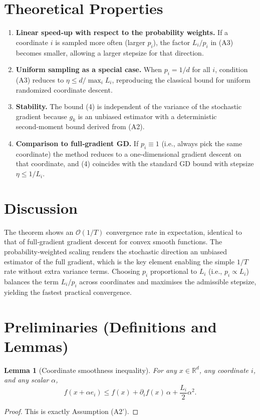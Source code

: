 \documentclass[11pt]{article}
\newtheorem{lemma}{Lemma}
\newcommand{\RR}{\mathbb{R}}
\begin{document}
\section*{Theoretical Properties}
\begin{enumerate}[label=\textbf{P\arabic*}, leftmargin=*]
\item \textbf{Linear speed‑up with respect to the probability weights.}
If a coordinate $i$ is sampled more often (larger $p_i$), the factor $L_i/p_i$ in (A3) becomes smaller, allowing a larger stepsize for that direction.

\item \textbf{Uniform sampling as a special case.}
When $p_i=1/d$ for all $i$, condition (A3) reduces to $\eta\le d/\max_i L_i$, reproducing the classical bound for uniform randomized coordinate descent.

\item \textbf{Stability.}
The bound (4) is independent of the variance of the stochastic gradient because $g_k$ is an unbiased estimator with a deterministic second‑moment bound derived from (A2).

\item \textbf{Comparison to full‑gradient GD.}
If $p_i\equiv1$ (i.e., always pick the same coordinate) the method reduces to a one‑dimensional gradient descent on that coordinate, and (4) coincides with the standard GD bound with stepsize $\eta\le 1/L_i$.
\end{enumerate}

\section*{Discussion}
The theorem shows an $\mathcal O(1/T)$ convergence rate in expectation, identical to that of full‑gradient gradient descent for convex smooth functions. The probability‑weighted scaling renders the stochastic direction an unbiased estimator of the full gradient, which is the key element enabling the simple $1/T$ rate without extra variance terms. Choosing $p_i$ proportional to $L_i$ (i.e., $p_i\propto L_i$) balances the term $L_i/p_i$ across coordinates and maximises the admissible stepsize, yielding the fastest practical convergence.

\newpage

\section*{Preliminaries (Definitions and Lemmas)}
\begin{lemma}[Coordinate smoothness inequality]\label{lem:smooth}
For any $x\in\RR^{d}$, any coordinate $i$, and any scalar $\alpha$,
\[
f(x+\alpha e_i)\le f(x)+\partial_i f(x)\,\alpha+\frac{L_i}{2}\alpha^{2}.
\]
\end{lemma}
\begin{proof}
This is exactly Assumption (A2'). \qedhere
\end{proof}
\end{document}
